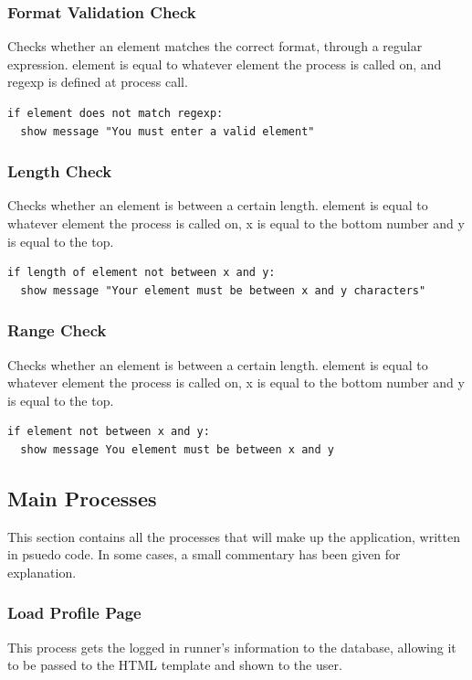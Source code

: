\documentclass{article}[12pt,a4paper]
\begin{document}
\subsubsection{Format Validation Check}
Checks whether an element matches the correct format, through a regular expression. element is equal to whatever element the process is called on, and regexp is defined at process call.
\begin{verbatim}
if element does not match regexp:
  show message "You must enter a valid element"
\end{verbatim}

\subsubsection{Length Check}
Checks whether an element is between a certain length. element is equal to whatever element the process is called on, x is equal to the bottom number and y is equal to the top.
\begin{verbatim}
if length of element not between x and y:
  show message "Your element must be between x and y characters"
\end{verbatim}

\subsubsection{Range Check}
Checks whether an element is between a certain length. element is equal to whatever element the process is called on, x is equal to the bottom number and y is equal to the top.
\begin{verbatim}
if element not between x and y:
  show message You element must be between x and y
\end{verbatim}


\subsection{Main Processes}
This section contains all the processes that will make up the application, written in psuedo code. In some cases, a small commentary has been given for explanation.

\subsubsection{Load Profile Page}
This process gets the logged in runner's information to the database, allowing it to be passed to the HTML template and shown to the user.
\end{document}
